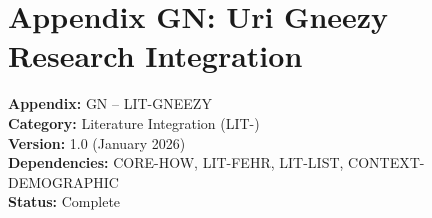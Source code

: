 
\chapter*{Appendix GN: Uri Gneezy Research Integration}
\label{app:gneezy}

\begin{tcolorbox}[colback=white,colframe=black!75!white,title=Appendix Metadata]
\textbf{Appendix:} GN -- LIT-GNEEZY \\
\textbf{Category:} Literature Integration (LIT-) \\
\textbf{Version:} 1.0 (January 2026) \\
\textbf{Dependencies:} CORE-HOW, LIT-FEHR, LIT-LIST, CONTEXT-DEMOGRAPHIC \\
\textbf{Status:} Complete
\end{tcolorbox}

